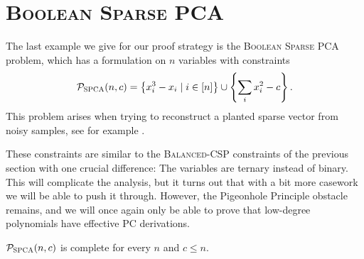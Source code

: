 \section{\textsc{Boolean Sparse PCA}}
The last example we give for our proof strategy is the \textsc{Boolean Sparse PCA} problem, which has a formulation on $n$ variables with constraints
\begin{align}
\mathcal P_{\textsc{SPCA}}(n,c) = \left\{x_i^3 - x_i \mid i \in [n]\right\} \cup \left\{\sum_i x_i^2 - c\right\}.\label{eq:bspca-formulation}
\end{align}
This problem arises when trying to reconstruct a planted sparse vector from noisy samples, see for example \cite{MW15}.

These constraints are similar to the \textsc{Balanced-CSP} constraints of the previous section with one crucial difference: The variables are ternary instead of binary.
This will complicate the analysis, but it turns out that with a bit more casework we will be able to push it through.
However, the Pigeonhole Principle obstacle remains, and we will once again only be able to prove that low-degree polynomials have effective PC derivations.
\begin{lemma}\label{lem:bspca-complete}
$\mathcal P_{\textsc{SPCA}}(n,c)$ is complete for every $n$ and $c \leq n$.
\end{lemma}
